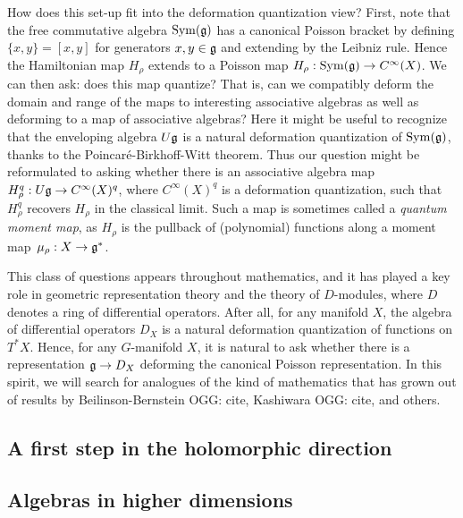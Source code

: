 \documentclass[11pt]{amsart}
\def\owen#1{{\textcolor{green!65!black}{OGG: {#1}}}}
\begin{document}
How does this set-up fit into the deformation quantization view?
First, note that the free commutative algebra $\operatorname{Sym}(\mathfrak g)$ has a canonical Poisson bracket by defining $ \{x, y \}   = [x, y]$ for generators $x, y \in \mathfrak g$ and extending by the Leibniz rule.
Hence the Hamiltonian map $H_\rho$ extends to a Poisson map $H_\rho: \operatorname{Sym}(\mathfrak g) \to C^\infty(X)$.
We can then ask: does this map quantize? That is, can we compatibly deform the domain and range of the maps to interesting associative algebras as well as deforming to a map of associative algebras?
Here it might be useful to recognize that the enveloping algebra $U\mathfrak g$ is a natural deformation quantization of $\operatorname{Sym}(\mathfrak g)$, thanks to the Poincar\'e-Birkhoff-Witt theorem.
Thus our question might be reformulated to asking whether there is an associative algebra map $H^q_\rho: U\mathfrak g \to C^\infty(X)^q$, where $C^\infty(X)^q$ is a deformation quantization, such that $H^q_\rho$ recovers $H_\rho$ in the classical limit.
Such a map is sometimes called a {\em quantum moment map},
as $H_\rho$ is the pullback of (polynomial) functions along a moment map~$\mu_\rho: X \to \mathfrak g^*$.

This class of questions appears throughout mathematics,
and it has played a key role in geometric representation theory and the theory of $D$-modules, where $D$ denotes a ring of differential operators.
After all, for any manifold $X$, the algebra of differential operators $D_X$ is a natural deformation quantization of functions on $T^* X$.
Hence, for any $G$-manifold $X$, it is natural to ask whether there is a representation $\mathfrak g \to D_X$ deforming the canonical Poisson representation.
In this spirit, we will search for analogues of the kind of mathematics that has grown out of results by Beilinson-Bernstein \owen{cite}, Kashiwara \owen{cite}, and others.

\subsection{A first step in the holomorphic direction}



\subsection{Algebras in higher dimensions }
\end{document}
